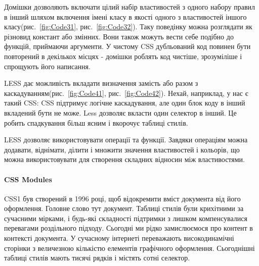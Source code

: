 
Домішки дозволяють включати цілий набір властивостей з одного набору правил в інший шляхом включення імені класу в якості одного з властивостей іншого класу(рис.~\ref{fig:Code31}, рис.~\ref{fig:Code32}). Таку поведінку можна розглядати як різновид констант або змінних. Вони також можуть вести себе подібно до функцій, приймаючи аргументи. У чистому CSS дубльований код повинен бути повторений в декількох місцях - домішки роблять код чистіше, зрозуміліше і спрощують його написання.



LESS дає можливість вкладати визначення замість або разом з каскадуванням(рис.~\ref{fig:Code41}, рис.~\ref{fig:Code42}). Нехай, наприклад, у нас є такий CSS: CSS підтримує логічне каскадування, але один блок коду в інший вкладений бути не може. Less дозволяє вкласти один селектор в інший. Це робить спадкування більш ясним і вкорочує таблиці стилів.



LESS дозволяє використовувати операції та функції. Завдяки операціям можна додавати, віднімати, ділити і множити значення властивостей і кольорів, що можна використовувати для створення складних відносин між властивостями.

\paragraph{CSS Modules}

CSS1 був створений в 1996 році, щоб відокремити вміст документа від його оформлення. Головне слово тут документ. Таблиці стилів були крихітними за сучасними мірками, і будь-які складності підтримки з лишком компенсувалися перевагами роздільного підходу. Сьогодні ми рідко замислюємося про контент в контексті документа. У сучасному інтернеті переважають високодинамічні сторінки з величезною кількістю елементів графічного оформлення. Сьогоднішні таблиці стилів мають тисячі рядків і містять сотні селектор.

